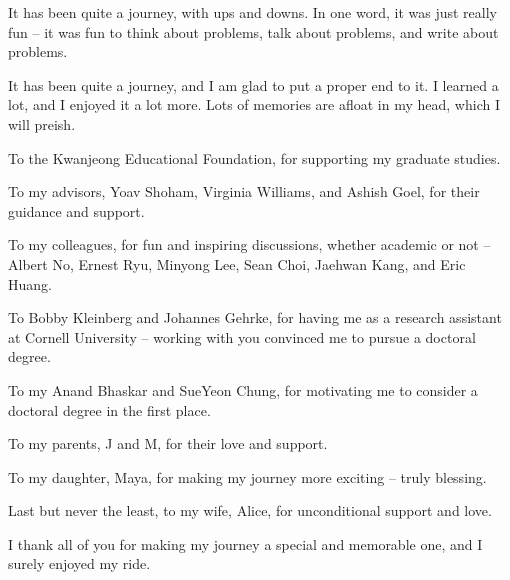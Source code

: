 It has been quite a journey, with ups and downs.
In one word, it was just really fun -- it was fun to think about problems, talk about problems, and write about problems. 

It has been quite a journey, and I am glad to put a proper end to it. 
I learned a lot, and I enjoyed it a lot more. 
Lots of memories are afloat in my head, which I will preish. 


To the Kwanjeong Educational Foundation, for supporting my graduate studies.

To my advisors, Yoav Shoham, Virginia Williams, and Ashish Goel, for their guidance and support.

To my colleagues, for fun and inspiring discussions, whether academic or not -- Albert No, Ernest Ryu, Minyong Lee, Sean Choi, Jaehwan Kang, and Eric Huang.

To Bobby Kleinberg and Johannes Gehrke, for having me as a research assistant at Cornell University -- working with you convinced me to pursue a doctoral degree.

To my Anand Bhaskar and SueYeon Chung, for motivating me to consider a doctoral degree in the first place.

To my parents, J and M, for their love and support.

To my daughter, Maya, for making my journey more exciting -- truly blessing.

Last but never the least, to my wife, Alice, for unconditional support and love.

I thank all of you for making my journey a special and memorable one, and I surely enjoyed my ride.


